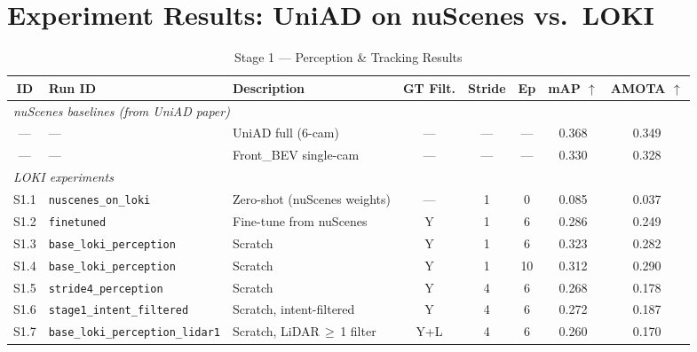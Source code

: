 \documentclass[11pt]{article}
\begin{document}
\section*{Experiment Results: UniAD on nuScenes vs.\ LOKI}

\begin{table}[h]
\centering
\caption{Stage 1 --- Perception \& Tracking Results}
\label{tab:stage1}
\small
\begin{tabular}{@{} c l l c c c c c @{}}
\toprule
\textbf{ID} & \textbf{Run ID} & \textbf{Description} & \textbf{GT Filt.} & \textbf{Stride} & \textbf{Ep} & \textbf{mAP $\uparrow$} & \textbf{AMOTA $\uparrow$} \\
\midrule
\multicolumn{8}{l}{\textit{nuScenes baselines (from UniAD paper)}} \\
\addlinespace[2pt]
--- & ---                                & UniAD full (6-cam)           & --- & --- & --- & 0.368 & 0.349 \\
--- & ---                                & Front\_BEV single-cam        & --- & --- & --- & 0.330 & 0.328 \\
\midrule
\multicolumn{8}{l}{\textit{LOKI experiments}} \\
\addlinespace[2pt]
S1.1 & \texttt{nuscenes\_on\_loki}        & Zero-shot (nuScenes weights) & ---   & 1 &  0 & 0.085 & 0.037 \\
S1.2 & \texttt{finetuned}                 & Fine-tune from nuScenes      & Y     & 1 &  6 & 0.286 & 0.249 \\
S1.3 & \texttt{base\_loki\_perception}    & Scratch                      & Y     & 1 &  6 & 0.323 & 0.282 \\
S1.4 & \texttt{base\_loki\_perception}    & Scratch                      & Y     & 1 & 10 & 0.312 & 0.290 \\
S1.5 & \texttt{stride4\_perception}       & Scratch                      & Y     & 4 &  6 & 0.268 & 0.178 \\
S1.6 & \texttt{stage1\_intent\_filtered}  & Scratch, intent-filtered     & Y     & 4 &  6 & 0.272 & 0.187 \\
S1.7 & \texttt{base\_loki\_perception\_lidar1} & Scratch, LiDAR\,$\geq$\,1 filter & Y+L   & 4 &  6 & 0.260 & 0.170 \\
\bottomrule
\end{tabular}
\end{table}
\end{document}
